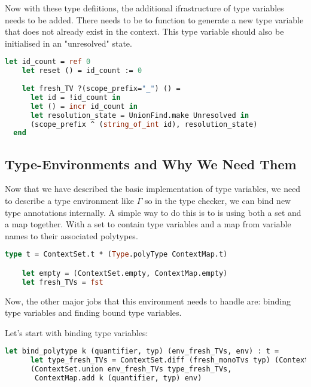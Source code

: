 \documentclass{l4proj}
\begin{document}
Now with these type defiitions, the additional ifrastructure of type variables needs to be added.
There needs to be to function to generate a new type variable that does not already exist in the context.
This type variable should also be initialised in an "unresolved" state.

\begin{lstlisting}[language=Caml, caption=The simple implementation of type variables. The fresh\_TV function generates a new\, unresolved type variable.]
    let id_count = ref 0
    let reset () = id_count := 0
    
    let fresh_TV ?(scope_prefix="_") () =
      let id = !id_count in
      let () = incr id_count in
      let resolution_state = UnionFind.make Unresolved in
      (scope_prefix ^ (string_of_int id), resolution_state)
  end
\end{lstlisting}

\subsection{Type-Environments and Why We Need Them}

Now that we have described the basic implementation of type variables, we need to describe a type environment like $\Gamma$ so in the type checker, we can bind new type annotations internally.
A simple way to do this is to is using both a set and a map together.
With a set to contain type variables and a map from variable names to their associated polytypes.

\begin{lstlisting}[language=Caml]
    type t = ContextSet.t * (Type.polyType ContextMap.t)

    let empty = (ContextSet.empty, ContextMap.empty)
    let fresh_TVs = fst
\end{lstlisting}

Now, the other major jobs that this environment needs to handle are: binding type variables and finding bound type variables.

Let's start with binding type variables:

\begin{lstlisting}[language=Caml]
    let bind_polytype k (quantifier, typ) (env_fresh_TVs, env) : t =
      let type_fresh_TVs = ContextSet.diff (fresh_monoTvs typ) (ContextSet.of_list quantifier) in
      (ContextSet.union env_fresh_TVs type_fresh_TVs,
       ContextMap.add k (quantifier, typ) env)
\end{lstlisting}
\end{document}
